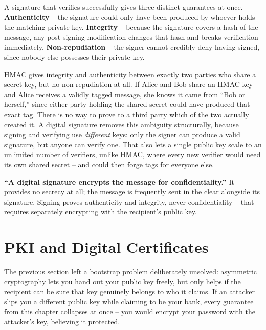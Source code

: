 A signature that verifies successfully gives three distinct guarantees at once. \textbf{Authenticity}
-- the signature could only have been produced by whoever holds the matching private key.
\textbf{Integrity} -- because the signature covers a hash of the message, any post-signing
modification changes that hash and breaks verification immediately. \textbf{Non-repudiation} -- the
signer cannot credibly deny having signed, since nobody else possesses their private key.

\begin{example}
HMAC gives integrity and authenticity between exactly two parties who share a secret key, but no
non-repudiation at all. If Alice and Bob share an HMAC key and Alice receives a validly tagged
message, she knows it came from ``Bob or herself,'' since either party holding the shared secret
could have produced that exact tag. There is no way to prove to a third party which of the two
actually created it. A digital signature removes this ambiguity structurally, because signing and
verifying use \emph{different} keys: only the signer can produce a valid signature, but anyone can
verify one. That also lets a single public key scale to an unlimited number of verifiers, unlike
HMAC, where every new verifier would need its own shared secret -- and could then forge tags for
everyone else.
\end{example}

\begin{misconception}
\textbf{``A digital signature encrypts the message for confidentiality.''} It provides no secrecy at
all; the message is frequently sent in the clear alongside its signature. Signing proves authenticity
and integrity, never confidentiality -- that requires separately encrypting with the recipient's
public key.
\end{misconception}

\section{PKI and Digital Certificates}

The previous section left a bootstrap problem deliberately unsolved: asymmetric cryptography lets
you hand out your public key freely, but only helps if the recipient can be sure that key genuinely
belongs to who it claims. If an attacker slips you a different public key while claiming to be your
bank, every guarantee from this chapter collapses at once -- you would encrypt your password with the
attacker's key, believing it protected.

